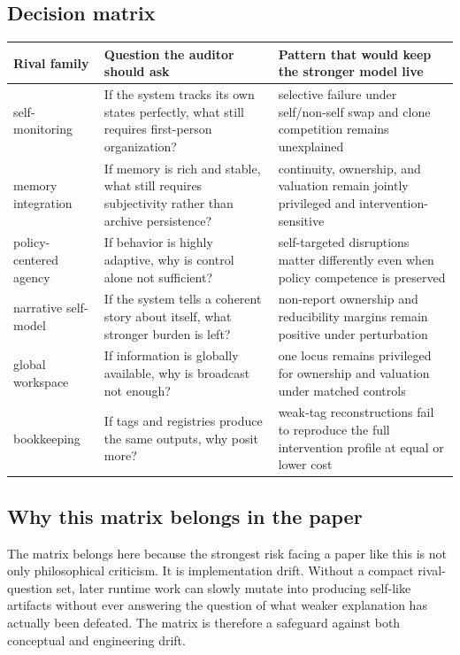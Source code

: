 \documentclass[11pt,a4paper]{article}
\theoremstyle{definition}
\begin{document}
\subsection{Decision matrix}
\begin{tabularx}{\textwidth}{@{}p{}p{}Y@{}}
\toprule
\textbf{Rival family} & \textbf{Question the auditor should ask} & \textbf{Pattern that would keep the stronger model live} \\
\midrule
self-monitoring & If the system tracks its own states perfectly, what still requires first-person organization? & selective failure under self/non-self swap and clone competition remains unexplained \\
memory integration & If memory is rich and stable, what still requires subjectivity rather than archive persistence? & continuity, ownership, and valuation remain jointly privileged and intervention-sensitive \\
policy-centered agency & If behavior is highly adaptive, why is control alone not sufficient? & self-targeted disruptions matter differently even when policy competence is preserved \\
narrative self-model & If the system tells a coherent story about itself, what stronger burden is left? & non-report ownership and reducibility margins remain positive under perturbation \\
global workspace & If information is globally available, why is broadcast not enough? & one locus remains privileged for ownership and valuation under matched controls \\
bookkeeping & If tags and registries produce the same outputs, why posit more? & weak-tag reconstructions fail to reproduce the full intervention profile at equal or lower cost \\
\bottomrule
\end{tabularx}

\subsection{Why this matrix belongs in the paper}
The matrix belongs here because the strongest risk facing a paper like this is not only philosophical criticism. It is implementation drift. Without a compact rival-question set, later runtime work can slowly mutate into producing self-like artifacts without ever answering the question of what weaker explanation has actually been defeated. The matrix is therefore a safeguard against both conceptual and engineering drift.
\end{document}
